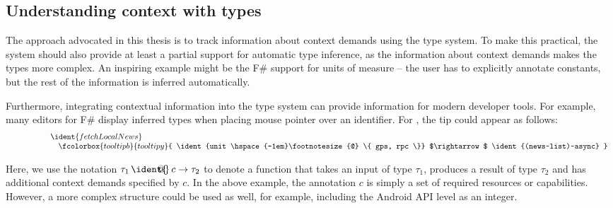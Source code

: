 
\newcommand{\introfuncblack}[3]{ \ident{#1 \hspace{-1em}\footnotesize{@} \{ #2 \}} $\rightarrow$ \ident{#3}  }
\newcommand{\introfunc}[3]{ \ident{#1 \hspace{-1em}\footnotesize{@} \aclrd{\{ #2 \}}} $\rightarrow$ \ident{#3}  }
\newcommand{\introvar}[2]{ \ident{#1 \hspace{-1em}\footnotesize{@} \cclrd{#2} } }


\subsection{Understanding context with types}

The approach advocated in this thesis is to track information about context demands using
the type system. To make this practical, the system should also provide at least a partial support for
automatic type inference, as the information about context demands makes the types more complex.
An inspiring example might be the F\# support for units of measure \cite{app-units} -- the user has
to explicitly annotate constants, but the rest of the information is inferred automatically.

Furthermore, integrating contextual information into the type system can provide information for
modern developer tools. For example, many editors for F\# display inferred types when placing mouse
pointer over an identifier. For , the tip could appear as follows:
%
\vspace{0.5em}
\begin{equation*}
\hspace{5em}
\begin{array}{l}
\ident{fetchLocalNews}\\
\hspace{1em} \fcolorbox{tooltipb}{tooltipy}{
	\introfuncblack{unit}{gps, rpc}{(news~list)~async}
}
\end{array}
\end{equation*}
\vspace{0.5em}

\noindent
Here, we use the notation $\tau_1 \,\ident{\hspace{-1em}\footnotesize{@}}\, c \rightarrow \tau_2$ to denote
a function that takes an input of type $\tau_1$, produces a result of type $\tau_2$ and has additional
context demands specified by $c$. In the above example, the annotation $c$ is simply a set of
required resources or capabilities. However, a more complex structure could be used as well, for example,
including the Android API level as an integer.

